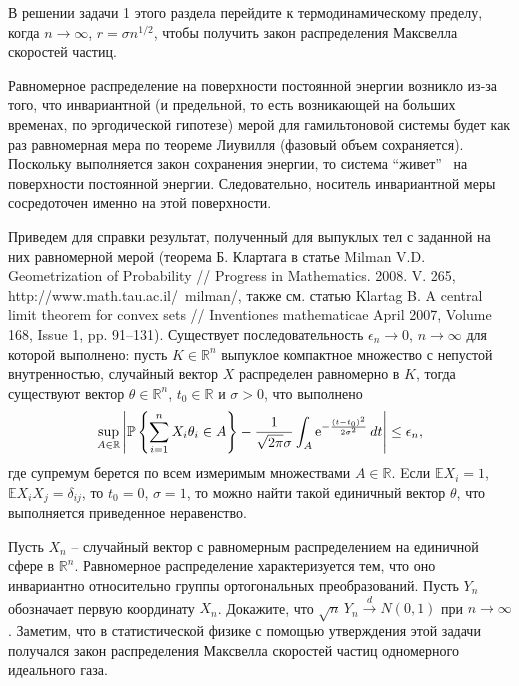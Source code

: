 \begin{ordre}
В решении задачи 1 этого раздела перейдите к термодинамическому пределу, когда $n\to\infty$, $r = \sigma n^{1/2}$, чтобы получить закон распределения Максвелла скоростей частиц.
\end{ordre}

\begin{remark}
Равномерное распределение на поверхности постоянной энергии возникло из-за того, что инвариантной (и предельной, то есть возникающей на больших временах, по эргодической гипотезе) мерой для гамильтоновой системы будет как раз равномерная мера  по теореме Лиувилля (фазовый объем сохраняется). Поскольку выполняется закон сохранения энергии, то система  ``живет'' \mbox{~на} поверхности постоянной энергии. Следовательно, носитель инвариантной меры сосредоточен именно на этой поверхности. 

Приведем для справки результат, полученный  для выпуклых тел с заданной на них равномерной мерой (теорема Б. Клартага в статье Milman V.D. Geometrization of Probability // Progress in Mathematics. 2008. V. 265, http://www.math.tau.ac.il/~milman/, также см. статью Klartag B. A central limit theorem for convex sets // Inventiones mathematicae
April 2007, Volume 168, Issue 1, pp. 91--131). Существует последовательность $\epsilon_n\to 0$, ${n\to\infty}$ для которой выполнено: пусть $K\in \mathbb{R}^n$ выпуклое компактное множество с непустой внутренностью, случайный вектор $X$ распределен равномерно в $K$, тогда существуют вектор $\theta\in\mathbb{R}^n$, $t_0\in\mathbb{R}$ и $\sigma>0$, что выполнено
\[
\sup_{A\in\mathbb{R}}\left|\mathbb{P}\left\{\sum_{i=1}^n X_i\theta_i\in A\right\} - \frac{1}{\sqrt{2\pi}\sigma}\int_{A}{\rm e}^{-\frac{(t-t_0)^2}{2\sigma^2}}\,dt\right|\leq \epsilon_n,
\]
где супремум берется по всем измеримым множествами $A\in\mathbb{R}$. Eсли $\mathbb{E}X_i=1$, $\mathbb{E}X_iX_j = \delta_{ij}$, то $t_0=0$, $\sigma=1$, то можно найти такой единичный вектор  $\theta$, что выполняется приведенное неравенство.

\end{remark}

\begin{problem}
Пусть $X_n$ -- случайный вектор с равномерным распределением на единичной сфере в ${\mathbb R}^n$. Равномерное распределение 
характеризуется тем, что оно инвариантно относительно группы ортогональных преобразований. Пусть $Y_n$ обозначает первую координату $X_n$. 
Докажите, что $\sqrt{n}\, Y_n \xrightarrow{d}N(0,1)$ при $n\to\infty$. Заметим, что в статистической физике с помощью утверждения 
этой задачи получался закон распределения Максвелла скоростей частиц одномерного идеального газа. 
\end{problem}

